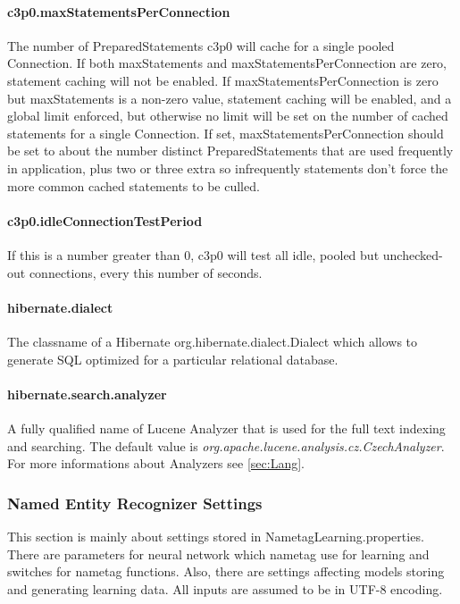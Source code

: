 \paragraph{c3p0.maxStatementsPerConnection}
The number of PreparedStatements c3p0 will cache for a single pooled Connection.
If both maxStatements and maxStatementsPerConnection are zero, statement caching
will not be enabled. If maxStatementsPerConnection is zero but maxStatements is
a non-zero value, statement caching will be enabled, and a global limit enforced,
but otherwise no limit will be set on the number of cached statements for a single
Connection. If set, maxStatementsPerConnection should be set to about the number
distinct PreparedStatements that are used frequently in application, plus
two or three extra so infrequently statements don't force the more common cached
statements to be culled.

\paragraph{c3p0.idleConnectionTestPeriod}
If this is a number greater than 0, c3p0 will test all idle, pooled but unchecked-out
connections, every this number of seconds.

\paragraph{hibernate.dialect}
The classname of a Hibernate org.hibernate.dialect.Dialect which allows to generate
SQL optimized for a particular relational database.

\paragraph{hibernate.search.analyzer}
A fully qualified name of Lucene Analyzer that is used for the full text indexing
and searching. The default value is \emph{org.\-apache.\-lucene.\-analysis.\-cz.\-CzechAnalyzer}.
For more informations about Analyzers see \ref{sec:Lang}.

\subsubsection{Named Entity Recognizer Settings}
\label{sssec:NametagSettings}
This section is mainly about settings stored in NametagLearning.properties. There
are parameters for neural network which nametag use for learning and switches for
nametag functions. Also, there are settings affecting models storing and
generating learning data. All inputs are assumed to be in UTF-8 encoding.


